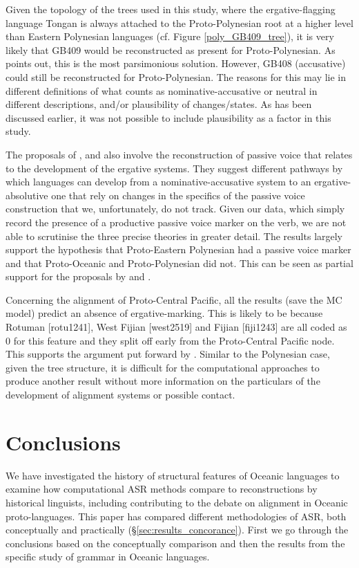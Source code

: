\documentclass[12pt,letterpaper]{article}
\begin{document}
Given the topology of the trees used in this study, where the ergative-flagging language Tongan is always attached to the Proto-Polynesian root at a higher level than Eastern Polynesian languages (cf. Figure \ref{poly_GB409_tree}), it is very likely that GB409 would be reconstructed as present for Proto-Polynesian. As \citeauthor{clark1973aspects} points out, this is the most parsimonious solution. However, GB408 (accusative) could still be reconstructed for Proto-Polynesian. The reasons for this may lie in different definitions of what counts as nominative-accusative or neutral in different descriptions, and/or plausibility of changes/states. As has been discussed earlier, it was not possible to include plausibility as a factor in this study.

The proposals of \citet{hale_1968}, \citet{hohepa_1967, hohepa_1969} and \citet{chung1978} also involve the reconstruction of passive voice that relates to the development of the ergative systems. They suggest different pathways by which languages can develop from a nominative-accusative system to an ergative-absolutive one that rely on changes in the specifics of the passive voice construction that we, unfortunately, do not track. Given our data, which simply record the presence of a productive passive voice marker on the verb, we are not able to scrutinise the three precise theories in greater detail. The results largely support the hypothesis that Proto-Eastern Polynesian had a passive voice marker and that Proto-Oceanic and Proto-Polynesian did not. This can be seen as partial support for the proposals by \citet{hale_1968, hohepa_1967, hohepa_1969} and \citet{chung1978}.

Concerning the alignment of Proto-Central Pacific, all the results (save the MC model) predict an absence of ergative-marking. This is likely to be because Rotuman [rotu1241], West Fijian [west2519] and Fijian [fiji1243] are all coded as 0 for this feature and they split off early from the Proto-Central Pacific node. This supports the argument put forward by \citet{ball2007ergativity}. Similar to the Polynesian case, given the tree structure, it is difficult for the computational approaches to produce another result without more information on the particulars of the development of alignment systems or possible contact.

\FloatBarrier
\section{Conclusions}
\label{conclusions}
We have investigated the history of structural features of Oceanic languages to examine how computational ASR methods compare to reconstructions by historical linguists, including contributing to the debate on alignment in Oceanic proto-languages. This paper has compared different methodologies of ASR, both conceptually and practically (§\ref{sec:results_concorance}). First we go through the conclusions based on the conceptually comparison and then the results from the specific study of grammar in Oceanic languages.
\end{document}
